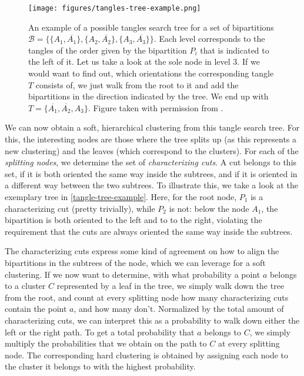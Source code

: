 \begin{figure}[h]
    \centering
    \texttt{[image: figures/tangles-tree-example.png]}
    \caption{An example of a possible tangles search tree for a set of bipartitions $\mathcal{B} = \{\{A_1, \overline{A_1}\}, \{A_2, \overline{A_2}\}, \{A_3, \overline{A_3}\} \}$. 
        Each level corresponds to the tangles of the order given by the bipartition $P_i$ that is indicated to the left of it.
        Let us take a look at the sole node in level 3. If we would want to find out, which orientations the corresponding tangle $T$ consists of, we just walk from
        the root to it and add the bipartitions in the direction indicated by the tree. We end up with $T = \{\overline{A_1}, \overline{A_2}, A_3\}$. 
        Figure taken with permission from \cite{klepperClusteringTanglesAlgorithmic2020A}.}
    \label{fig:figures-tangles-tree-example}
\end{figure}

We can now obtain a soft, hierarchical clustering from this tangle search tree. For this, the interesting nodes are those
where the tree splits up (as this represents a new clustering) and the leaves (which correspond to the clusters). 
For each of the \textit{splitting nodes}, we determine the set of \textit{characterizing cuts}.
A cut belongs to this set, if it is both oriented the same way inside the subtrees, and if it is oriented in a different way between the two subtrees.
To illustrate this, we take a look at the exemplary tree in \autoref{tangle-tree-example}. Here, for the root node, $P_1$ is a characterizing cut (pretty trivially),
while $P_2$ is not: below the node $A_1$, the bipartition is both oriented to the left and to to the right, violating the requirement that the cuts are always oriented
the same way inside the subtrees. 

The characterizing cuts express some kind of agreement on how to align the bipartitions in the subtrees of the node, which we can leverage 
for a soft clustering. If we now want to determine, with what probability a point $a$ belongs to a cluster $C$ represented by a leaf in the tree, we simply walk down 
the tree from the root, and count at every splitting node how many characterizing cuts contain the point $a$, and how many don't. Normalized by the total amount of
characterizing cuts, we can interpret this as a probability to walk down either the left or the right path. To get a total probability that $a$ belongs to $C$, 
we simply multiply the probabilities that we obtain on the path to $C$ at every splitting node. The corresponding hard clustering is obtained by assigning each
node to the cluster it belongs to with the highest probability.
    
